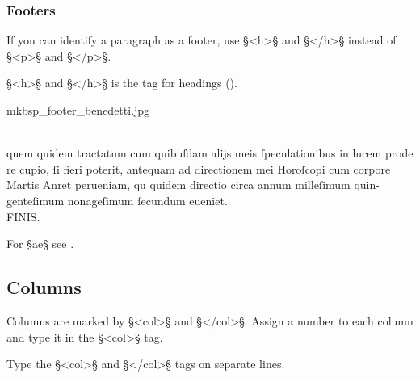 \subsubsection{Footers}

\begin{mainruleLessImportant}
If you can identify a paragraph as a footer, use §<h>§ and §</h>§ instead of §<p>§ and §</p>§.
\end{mainruleLessImportant}

\begin{crossref}
§<h>§ and §</h>§ is the tag for headings ().
\end{crossref}

\begin{sampleImage}{mkbsp_footer_benedetti.jpg}
\begin{typeLatin}
 \someText \\
quem quidem tractatum cum quibuſdam alijs meis ſpeculationibus in lucem prode\\
re cupio, ſi fieri poterit, antequam ad directionem mei Horoſcopi cum corpore\\
Martis Anret perueniam, qu quidem directio circa annum milleſimum quin-\\
genteſimum nonageſimum ſecundum eueniet.\\
FINIS.
\end{typeLatin}

\end{sampleImage}

\begin{crossref}
For §{ae}§ see .
\end{crossref}


\tocspace
\subsection{Columns}
\label{section columns}

\begin{mainrule}
Columns are marked by §<col>§ and §</col>§. Assign a number to each column and type it in the §<col>§ tag.
\end{mainrule}

\begin{clarification}
Type the §<col>§ and §</col>§ tags on separate lines.
\end{clarification}

\mehrzeilen

